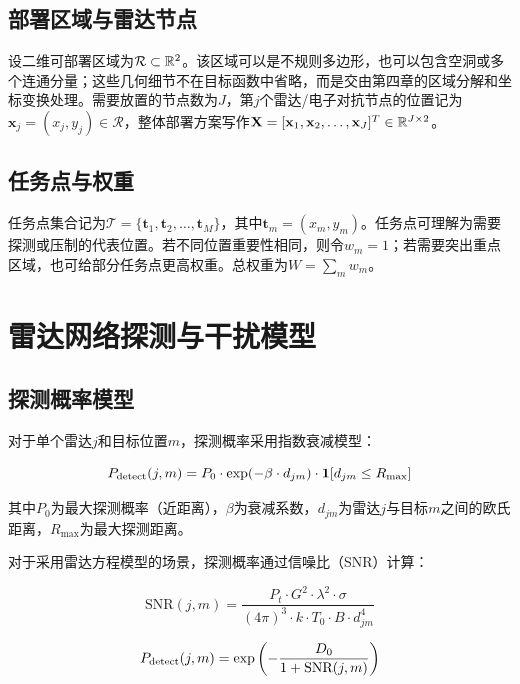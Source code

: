 \subsection{部署区域与雷达节点}

设二维可部署区域为$\mathcal{R} \subset \mathbb{R}^2$。该区域可以是不规则多边形，也可以包含空洞或多个连通分量；这些几何细节不在目标函数中省略，而是交由第四章的区域分解和坐标变换处理。需要放置的节点数为$J$，第$j$个雷达/电子对抗节点的位置记为$\mathbf{x}_j=(x_j,y_j)\in\mathcal{R}$，整体部署方案写作$\mathbf{X}=[\mathbf{x}_1,\mathbf{x}_2,\ldots,\mathbf{x}_J]^T\in\mathbb{R}^{J\times2}$。

\subsection{任务点与权重}

任务点集合记为$\mathcal{T}=\{\mathbf{t}_1,\mathbf{t}_2,\ldots,\mathbf{t}_M\}$，其中$\mathbf{t}_m=(x_m,y_m)$。任务点可理解为需要探测或压制的代表位置。若不同位置重要性相同，则令$w_m=1$；若需要突出重点区域，也可给部分任务点更高权重。总权重为$W=\sum_m w_m$。

\section{雷达网络探测与干扰模型}

\subsection{探测概率模型}

对于单个雷达$j$和目标位置$m$，探测概率采用指数衰减模型：

\begin{equation}
P_{\text{detect}}(j, m) = P_0 \cdot \exp(-\beta \cdot d_{jm}) \cdot \mathbf{1}[d_{jm} \leq R_{\max}]
\label{eq:detection_prob}
\end{equation}

其中$P_0$为最大探测概率（近距离），$\beta$为衰减系数，$d_{jm}$为雷达$j$与目标$m$之间的欧氏距离，$R_{\max}$为最大探测距离。

对于采用雷达方程模型的场景，探测概率通过信噪比（SNR）计算：

\begin{equation}
\text{SNR}(j, m) = \frac{P_t \cdot G^2 \cdot \lambda^2 \cdot \sigma}{(4\pi)^3 \cdot k \cdot T_0 \cdot B \cdot d_{jm}^4}
\label{eq:snr}
\end{equation}

\begin{equation}
P_{\text{detect}}(j, m) = \exp\left(-\frac{D_0}{1 + \text{SNR}(j, m)}\right)
\label{eq:detection_prob_radar}
\end{equation}

